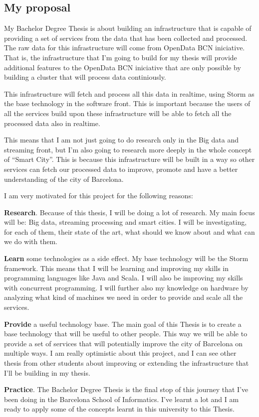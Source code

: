 \subsection{My proposal}

My Bachelor Degree Thesis is about building an infrastructure that is capable
of providing a set of services from the data that has been collected and
processed. The raw data for this infrastructure will come from OpenData
BCN\cite{opendata} iniciative. That is, the infrastructure that I'm going
to build for my thesis will provide additional features to the OpenData
BCN iniciative that are only possible by building a cluster that will
process data continiously.

This infrastructure will fetch and process all this data in realtime, using
Storm as the base technology in the software front. This is important because
the users of all the services build upon these infrastructure will be able to
fetch all the processed data also in realtime.

This means that I am not just going to do research only in the Big data and
streaming front, but I'm also going to research more deeply in the whole concept
of ``Smart City''. This is because this infrastructure will be built in a way
so other services can fetch our processed data to improve, promote and have a
better understanding of the city of Barcelona.

I am very motivated for this project for the following reasons:

\mylist
  \item {\bf Research}. Because of this thesis, I will be doing a lot of
research. My main focus will be: Big data, streaming processing and smart
cities. I will be investigating, for each of them, their state of the art, what
should we know about and what can we do with them.
  \item {\bf Learn} some technologies as a side effect. My base technology will
be the Storm framework. This means that I will be learning and improving my
skills in programming languages like Java and Scala. I will also be improving my
skills with concurrent programming. I will further also my knowledge on hardware
by analyzing what kind of machines we need in order to provide and scale all the
services.
  \item {\bf Provide} a useful technology base. The main goal of this Thesis is
to create a base technology that will be useful to other people. This way we
will be able to provide a set of services that will potentially improve the
city of Barcelona on multiple ways. I am really optimistic about this project,
and I can see other thesis from other students about improving or extending the
infrastructure that I'll be building in my thesis.
  \item {\bf Practice}. The Bachelor Degree Thesis is the final stop of this
journey that I've been doing in the Barcelona School of Informatics. I've
learnt a lot and I am ready to apply some of the concepts learnt in this
university to this Thesis.
\mylistend

